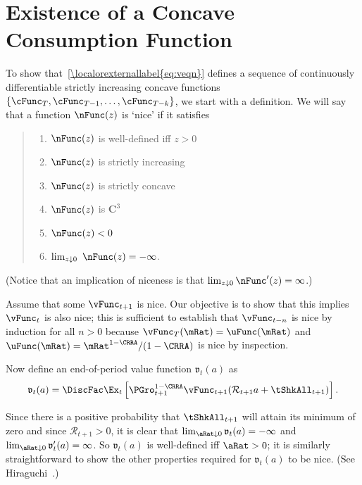\documentclass[\econtexRoot/BufferStockTheory]{subfiles}
\begin{document}
\section{Existence of a Concave Consumption Function}\label{sec:ApndxcExists}

To show that~\eqref{\localorexternallabel{eq:veqn}} defines a sequence of continuously differentiable strictly increasing concave functions $\{\cFunc_{T},\cFunc_{T-1},\ldots,\cFunc_{T-k}\}$, we start with a definition.  We will say that a function $\nFunc(z)$ is `nice' if it satisfies
\begin{quote}
\begin{enumerate}\setlength{\itemsep}{0.0ex}
\item $\nFunc(z)$ is well-defined iff $z>0$

\item $\nFunc(z)$ is strictly increasing

\item $\nFunc(z)$ is strictly concave

\item $\nFunc(z)$ is $ \mathbf{C}^{3}$

\item $\nFunc(z)<0$

\item $\lim_{z\downarrow 0}~\nFunc(z) =-\infty $.

\end{enumerate}
\end{quote}


(Notice that an implication of niceness is that $\lim_{z \downarrow 0} \nFunc^{\prime}(z) = \infty$.)

Assume that some $\vFunc_{t+1}$ is nice.  Our objective is to show that this
implies $\vFunc_{t}$ is also nice; this is sufficient to establish that
$\vFunc_{t-n}$ is nice by induction for all $n > 0$ because $\vFunc_{T}(\mRat)
=\uFunc(\mRat) $ and $\uFunc(\mRat)=\mRat^{1-\CRRA}/(1-\CRRA)$ is nice by inspection.

Now define an end-of-period value function $\mathfrak{v}_{t}(a) $ as
\begin{equation}
\mathfrak{v}_{t}(a) =\DiscFac \Ex_{t}\left[{\PGro}_{t+1}^{1-\CRRA}\vFunc_{t+1}( {\mathcal{R}}_{t+1} a+{\tShkAll}_{t+1}) \right]. \label{eq:vEnd}
\end{equation}

Since there is a positive probability that $\tShkAll_{t+1}$ will
attain its minimum of zero and since $\mathcal{R}_{t+1}>0$, it
is clear that $\lim_{\aRat \downarrow 0} \mathfrak{v}_{t}(a) = -\infty$
and $\lim_{\aRat \downarrow 0} \mathfrak{v}^{\prime}_{t}(a) = \infty$.  So
$\mathfrak{v}_{t}(a) $ is well-defined iff $\aRat>0$; it is similarly
straightforward to show the other properties required for $\mathfrak{v}_{t}(a) $ to
be nice.  (See Hiraguchi~\citeyearpar{hiraguchiBSProofs}.)
\end{document}
